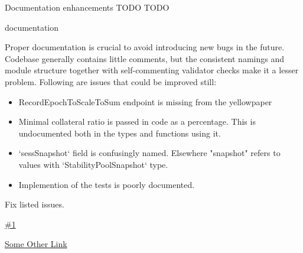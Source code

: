 \vuln
    { %
      Documentation enhancements
    }
    { %
      TODO
    }
    { %
      TODO
    }
    { %
    \item documentation
    }
    { %
    Proper documentation is crucial to avoid introducing new bugs in the future.
Codebase generally contains little comments, but the consistent namings and module structure together with self-commenting validator checks make it a lesser problem.
Following are issues that could be improved still:
\begin{itemize}
    \item RecordEpochToScaleToSum endpoint is missing from the yellowpaper
    \item Minimal collateral ratio is passed in code as a percentage. This is undocumented both in the types and functions using it.
    \item `sessSnapshot` field is confusingly named. Elsewhere "snapshot" refers to values with `StabilityPoolSnapshot` type.
    \item Implemention of the tests is poorly documented.
  \end{itemize}
  
    }
    { %
      Fix listed issues.
    }
    { %
    \item\href{https://github.com/IndigoProtocol/smart-contracts/issues/478}{\#1}
    \item\href{github.com}{Some Other Link}
    }
